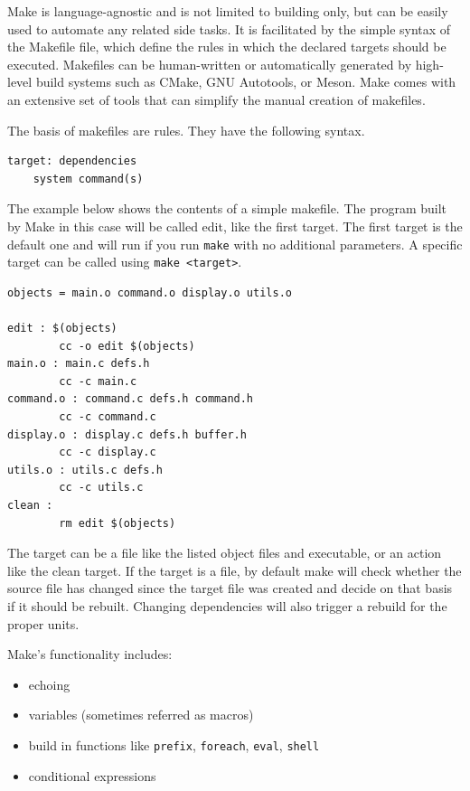 Make is language-agnostic and is not limited to building only, but can
be easily used to automate any related side tasks. It is facilitated by
the simple syntax of the Makefile file, which define the rules in which
the declared targets should be executed. Makefiles can be human-written
or automatically generated by high-level build systems such as CMake,
GNU Autotools, or Meson. Make comes with an extensive set of tools that
can simplify the manual creation of makefiles.

The basis of makefiles are rules. They have the following syntax.

\begin{verbatim}
target: dependencies
    system command(s)
\end{verbatim}

The example below shows the contents of a simple makefile. The program
built by Make in this case will be called edit, like the first target.
The first target is the default one and will run if you run
\texttt{make} with no additional parameters. A specific target can be
called using \texttt{make\ \textless{}target\textgreater{}}.

\begin{lstlisting}[frame=single, caption={%
  Example of simple MakeFile \cite{MAKEFILE}%
}]
objects = main.o command.o display.o utils.o

edit : $(objects)
        cc -o edit $(objects)
main.o : main.c defs.h
        cc -c main.c
command.o : command.c defs.h command.h
        cc -c command.c
display.o : display.c defs.h buffer.h
        cc -c display.c
utils.o : utils.c defs.h
        cc -c utils.c
clean :
        rm edit $(objects)
\end{lstlisting}

The target can be a file like the listed object files and executable, or
an action like the clean target. If the target is a file, by default
make will check whether the source file has changed since the target
file was created and decide on that basis if it should be rebuilt.
Changing dependencies will also trigger a rebuild for the proper units.

Make's functionality includes:

\begin{itemize}
\item
  echoing
\item
  variables (sometimes referred as macros)
\item
  build in functions like \texttt{prefix}, \texttt{foreach},
  \texttt{eval}, \texttt{shell}
\item
  conditional expressions
\end{itemize}

